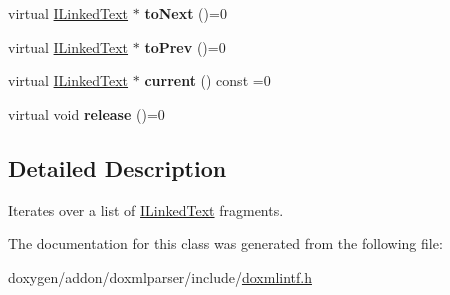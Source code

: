\begin{DoxyCompactItemize}
\item 
\mbox{\label{class_i_linked_text_iterator_abf50d307500a5eac81ba9490798efa0f}} 
virtual \mbox{\hyperlink{class_i_linked_text}{I\+Linked\+Text}} $\ast$ {\bfseries to\+Next} ()=0
\item 
\mbox{\label{class_i_linked_text_iterator_a201eb64f1c748ada8a8caefe8b8b88f1}} 
virtual \mbox{\hyperlink{class_i_linked_text}{I\+Linked\+Text}} $\ast$ {\bfseries to\+Prev} ()=0
\item 
\mbox{\label{class_i_linked_text_iterator_a2021ae332e83cd86a63b83175532a01f}} 
virtual \mbox{\hyperlink{class_i_linked_text}{I\+Linked\+Text}} $\ast$ {\bfseries current} () const =0
\item 
\mbox{\label{class_i_linked_text_iterator_a843587325f105cf1a7e1341b6aa9e5d8}} 
virtual void {\bfseries release} ()=0
\end{DoxyCompactItemize}


\subsection{Detailed Description}
Iterates over a list of \mbox{\hyperlink{class_i_linked_text}{I\+Linked\+Text}} fragments. 

The documentation for this class was generated from the following file\+:\begin{DoxyCompactItemize}
\item 
doxygen/addon/doxmlparser/include/\mbox{\hyperlink{include_2doxmlintf_8h}{doxmlintf.\+h}}\end{DoxyCompactItemize}
